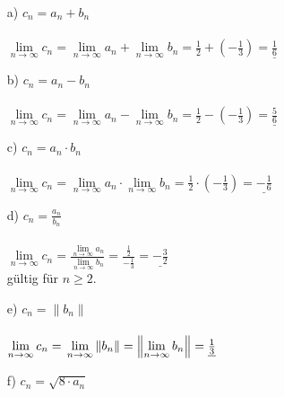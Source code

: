 \documentclass{scrreprt}
\begin{document}
\begin{enumerate}
{            \begin{enumerate}
                \item [a)]{
                    $c_n = a_n + b_n$\\\\
                    $\lim \limits_{n \to \infty} c_n =
                    \lim \limits_{n \to \infty} a_n + \lim \limits_{n \to \infty} b_n =
                    \frac{1}{2}+(-\frac{1}{3})= \underline{\frac{1}{6}}$
                }
                \item [b)]{
                    $c_n = a_n - b_n$\\\\
                    $\lim \limits_{n \to \infty} c_n =
                    \lim \limits_{n \to \infty} a_n - \lim \limits_{n \to \infty} b_n =
                    \frac{1}{2}-(-\frac{1}{3})= \underline{\frac{5}{6}}$
                }
                \item [c)]{
                    $c_n = a_n \cdot b_n$\\\\
                    $\lim \limits_{n \to \infty} c_n =
                    \lim \limits_{n \to \infty} a_n \cdot \lim \limits_{n \to \infty} b_n =
                    \frac{1}{2}\cdot(-\frac{1}{3})= \underline{-\frac{1}{6}}$
                }
                \item [d)]{
                    $c_n = \frac{a_n}{b_n}$\\\\
                    $\lim \limits_{n \to \infty} c_n =
                    \frac{\lim \limits_{n \to \infty} a_n} {\lim \limits_{n \to \infty} b_n} =
                    \frac {\frac{1}{2}}{-\frac{1}{3}}= \underline{-\frac{3}{2}}$\\
                    gültig für $n\geq 2$.
                }
                \item [e)]{
                    $c_n = \left\| b_n \right\|$\\\\
                    $\lim \limits_{n \to \infty} c_n =\\
                    \lim \limits_{n \to \infty} \left\| b_n \right\| =
                    \left\| \lim \limits_{n \to \infty} b_n \right\| =\\
                    \underline{\frac{1}{3}}$\\
                }
                \item [f)]{
                    $c_n = \sqrt{8\cdot a_n}$\\\\
}
\end{enumerate}}
\end{enumerate}
\end{document}
